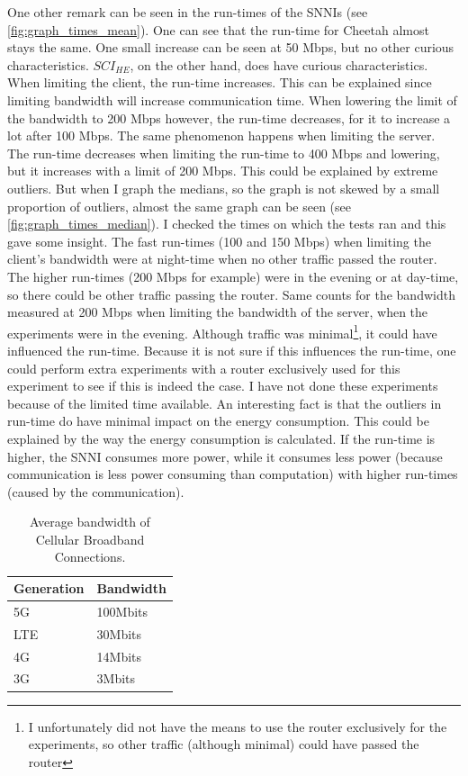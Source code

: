 \documentclass[../thesis.tex]{subfiles}
\begin{document}
One other remark can be seen in the run-times of the SNNIs (see \autoref{fig:graph_times_mean}). One can see that the run-time for Cheetah almost stays the same. One small increase can be seen at 50 Mbps, but no other curious characteristics. $SCI_{HE}$, on the other hand, does have curious characteristics. When limiting the client, the run-time increases. This can be explained since limiting bandwidth will increase communication time. When lowering the limit of the bandwidth to 200 Mbps however, the run-time decreases, for it to increase a lot after 100 Mbps. The same phenomenon happens when limiting the server. The run-time decreases when limiting the run-time to 400 Mbps and lowering, but it increases with a limit of 200 Mbps. This could be explained by extreme outliers. But when I graph the medians, so the graph is not skewed by a small proportion of outliers, almost the same graph can be seen (see \autoref{fig:graph_times_median}). I checked the times on which the tests ran and this gave some insight. The fast run-times (100 and 150 Mbps) when limiting the client's bandwidth were at night-time when no other traffic passed the router. The higher run-times (200 Mbps for example) were in the evening or at day-time, so there could be other traffic passing the router. Same counts for the bandwidth measured at 200 Mbps when limiting the bandwidth of the server, when the experiments were in the evening. Although traffic was minimal\footnote{I unfortunately did not have the means to use the router exclusively for the experiments, so other traffic (although minimal) could have passed the router}, it could have influenced the run-time. Because it is not sure if this influences the run-time, one could perform extra experiments with a router exclusively used for this experiment to see if this is indeed the case. I have not done these experiments because of the limited time available. An interesting fact is that the outliers in run-time do have minimal impact on the energy consumption. This could be explained by the way the energy consumption is calculated. If the run-time is higher, the SNNI consumes more power, while it consumes less power (because communication is less power consuming than computation) with higher run-times (caused by the communication).  

\begingroup
    \setlength{\intextsep}{0pt}
    \begin{table}
        \begin{tabular}{ll}
                Generation & Bandwidth \\ \hline
                5G         & 100Mbits  \\ \hline
                LTE        & 30Mbits   \\ \hline
                4G         & 14Mbits   \\ \hline
                3G         & 3Mbits   
        \end{tabular}
        \caption{Average bandwidth of Cellular Broadband Connections.}
        \label{table:bandwidth}
    \end{table}
\end{document}
